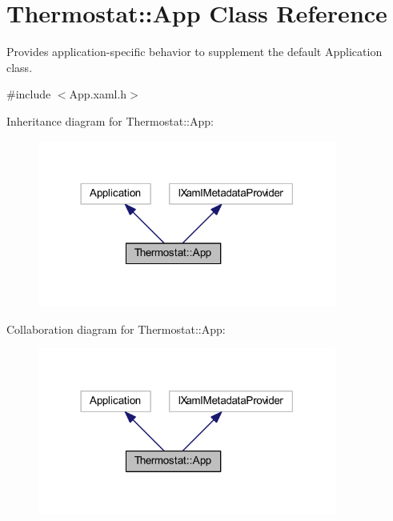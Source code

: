 \hypertarget{class_thermostat_1_1_app}{}\section{Thermostat\+:\+:App Class Reference}
\label{class_thermostat_1_1_app}


Provides application-\/specific behavior to supplement the default Application class.  




{\ttfamily \#include $<$App.\+xaml.\+h$>$}



Inheritance diagram for Thermostat\+:\+:App\+:\nopagebreak
\begin{figure}[H]
\begin{center}
\leavevmode
\includegraphics[width=278pt]{class_thermostat_1_1_app__inherit__graph}
\end{center}
\end{figure}


Collaboration diagram for Thermostat\+:\+:App\+:\nopagebreak
\begin{figure}[H]
\begin{center}
\leavevmode
\includegraphics[width=278pt]{class_thermostat_1_1_app__coll__graph}
\end{center}
\end{figure}
